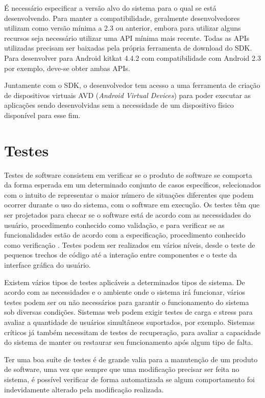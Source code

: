 É necessário especificar a versão alvo do sistema para o qual se está desenvolvendo. Para manter a compatibilidade, geralmente desenvolvedores utilizam como versão mínima a 2.3 ou anterior, embora para utilizar alguns recursos seja necessário utilizar uma API mínima mais recente. Todas as APIs utilizadas precisam ser baixadas pela própria ferramenta de download do SDK. Para desenvolver para Android kitkat 4.4.2 com compatibilidade com Android 2.3 por exemplo, deve-se obter ambas APIs.

Juntamente com o SDK, o desenvolvedor tem acesso a uma ferramenta de criação de dispositivos virtuais AVD (\textit{Android Virtual Devices}) para poder executar as aplicações sendo desenvolvidas sem a necessidade de um dispositivo físico disponível para esse fim.

\section{Testes}

Testes de software consistem em verificar se o produto de software se comporta da forma esperada em um determinado conjunto de casos específicos, selecionados com o intuito de representar o maior número de situações diferentes que podem ocorrer durante o uso do sistema, com o software em execução. Os testes têm que ser projetados para checar se o software está de acordo com as necessidades do usuário, procedimento conhecido como validação, e para verificar se as funcionalidades estão de acordo com a especificação, procedimento conhecido como verificação \cite{swebok}. Testes podem ser realizados em vários níveis, desde o teste de pequenos trechos de código até a interação entre componentes e o teste da interface gráfica do usuário.

Existem vários tipos de testes aplicáveis a determinados tipos de sistema. De acordo com as necessidades e o ambiente onde o sistema irá funcionar, vários testes podem ser ou não necessários para garantir o funcionamento do sistema sob diversas condições. Sistemas web podem exigir testes de carga e stress para avaliar a quantidade de usuários simultâneos suportados, por exemplo. Sistemas críticos já também necessitam de testes de recuperação, para avaliar a capacidade do sistema de manter ou restaurar seu funcionamento após algum tipo de falta.

Ter uma boa suíte de testes é de grande valia para a manutenção de um produto de software, uma vez que sempre que uma modificação precisar ser feita no sistema, é possível verificar de forma automatizada se algum comportamento foi indevidamente alterado pela modificação realizada.

